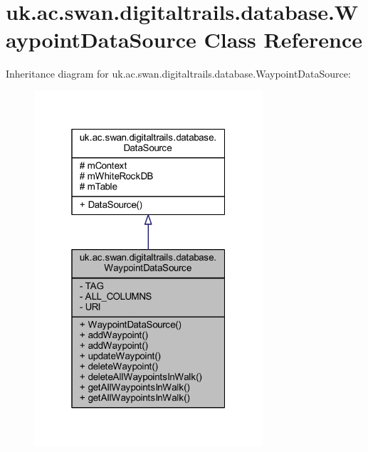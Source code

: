 \hypertarget{classuk_1_1ac_1_1swan_1_1digitaltrails_1_1database_1_1_waypoint_data_source}{\section{uk.\+ac.\+swan.\+digitaltrails.\+database.\+Waypoint\+Data\+Source Class Reference}
\label{classuk_1_1ac_1_1swan_1_1digitaltrails_1_1database_1_1_waypoint_data_source}
}


Inheritance diagram for uk.\+ac.\+swan.\+digitaltrails.\+database.\+Waypoint\+Data\+Source\+:
\nopagebreak
\begin{figure}[H]
\begin{center}
\leavevmode
\includegraphics[width=241pt]{classuk_1_1ac_1_1swan_1_1digitaltrails_1_1database_1_1_waypoint_data_source__inherit__graph}
\end{center}
\end{figure}


